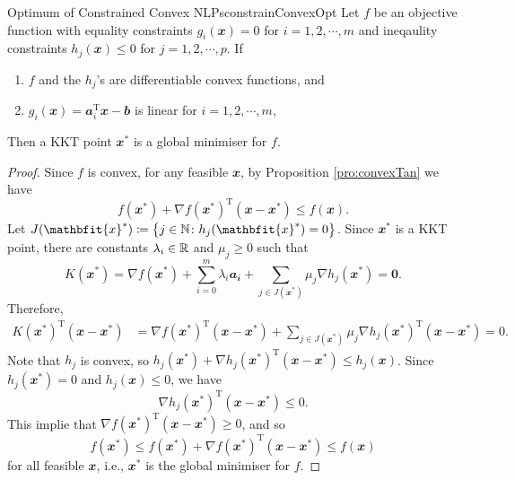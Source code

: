 \documentclass[math, code]{amznotes}
\theoremstyle{remark}
\begin{document}
\begin{thmbox}{Optimum of Constrained Convex NLPs}{constrainConvexOpt}
    Let $f$ be an objective function with equality constraints $g_i(\mathbfit{x}) = 0$ for $i = 1, 2, \cdots, m$ and ineqaulity constraints $h_j(\mathbfit{x}) \leq 0$ for $j = 1, 2, \cdots, p$. If 
    \begin{enumerate}
        \item $f$ and the $h_j$'s are differentiable convex functions, and
        \item $g_i(\mathbfit{x}) = \mathbfit{a}_i^{\mathrm{T}}\mathbfit{x} - \mathbfit{b}$ is linear for $i = 1, 2, \cdots, m$,
    \end{enumerate} 
    Then a KKT point $\mathbfit{x}^*$ is a global minimiser for $f$.
    \tcblower
    \begin{proof}
        Since $f$ is convex, for any feasible $\mathbfit{x}$, by Proposition \ref{pro:convexTan} we have
        \begin{equation*}
            f(\mathbfit{x}^*) + \nabla f(\mathbfit{x}^*)^{\mathrm{T}}(\mathbfit{x} - \mathbfit{x}^*) \leq f(\mathbfit{x}).
        \end{equation*}
        Let $J(\mathbfit{x}^*) \coloneqq \left\{j \in \N \colon h_j(\mathbfit{x}^*) = 0\right\}$. Since $\mathbfit{x}^*$ is a KKT point, there are constants $\lambda_i \in \mathbb{R}$ and $\mu_j \geq 0$ such that
        \begin{equation*}
            K(\mathbfit{x}^*) = \nabla f(\mathbfit{x}^*) + \sum_{i = 0}^{m}\lambda_i\mathbfit{a_i} + \sum_{j \in J(\mathbfit{x}^*)}\mu_j\nabla h_j(\mathbfit{x}^*) = \mathbf{0}.
        \end{equation*}
        Therefore, 
        \begin{align*}
            K(\mathbfit{x}^*)^{\mathrm{T}}(\mathbfit{x} - \mathbfit{x}^*) & = \nabla f(\mathbfit{x}^*)^{\mathrm{T}}(\mathbfit{x} - \mathbfit{x}^*) + \sum_{j \in J(\mathbfit{x}^*)}\mu_j\nabla h_j(\mathbfit{x}^*)^{\mathrm{T}}(\mathbfit{x} - \mathbfit{x}^*) = 0.
        \end{align*}
        Note that $h_j$ is convex, so $h_j(\mathbfit{x}^*) + \nabla h_j(\mathbfit{x}^*)^{\mathrm{T}}(\mathbfit{x} - \mathbfit{x}^*) \leq h_j(\mathbfit{x})$. Since $h_j(\mathbfit{x}^*) = 0$ and $h_j(\mathbfit{x}) \leq 0$, we have 
        \begin{equation*}
            \nabla h_j(\mathbfit{x}^*)^{\mathrm{T}}(\mathbfit{x} - \mathbfit{x}^*) \leq 0.
        \end{equation*}
        This implie that $\nabla f(\mathbfit{x}^*)^{\mathrm{T}}(\mathbfit{x} - \mathbfit{x}^*) \geq 0$, and so
        \begin{equation*}
            f(\mathbfit{x}^*) \leq f(\mathbfit{x}^*) + \nabla f(\mathbfit{x}^*)^{\mathrm{T}}(\mathbfit{x} - \mathbfit{x}^*) \leq f(\mathbfit{x})
        \end{equation*}
        for all feasible $\mathbfit{x}$, i.e., $\mathbfit{x}^*$ is the global minimiser for $f$.
    \end{proof}
\end{thmbox}
\end{document}
